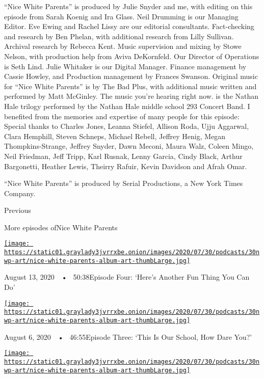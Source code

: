 ``Nice White Parents'' is produced by Julie Snyder and me, with editing
on this episode from Sarah Koenig and Ira Glass. Neil Drumming is our
Managing Editor. Eve Ewing and Rachel Lissy are our editorial
consultants. Fact-checking and research by Ben Phelan, with additional
research from Lilly Sullivan. Archival research by Rebecca Kent. Music
supervision and mixing by Stowe Nelson, with production help from Aviva
DeKornfeld. Our Director of Operations is Seth Lind. Julie Whitaker is
our Digital Manager. Finance management by Cassie Howley, and Production
management by Frances Swanson. Original music for ``Nice White Parents''
is by The Bad Plus, with additional music written and performed by Matt
McGinley. The music you're hearing right now. is the Nathan Hale trilogy
performed by the Nathan Hale middle school 293 Concert Band. I benefited
from the memories and expertise of many people for this episode: Special
thanks to Charles Jones, Leanna Stiefel, Allison Roda, Ujju Aggarwal,
Clara Hemphill, Steven Schneps, Michael Rebell, Jeffrey Henig, Megan
Thompkins-Strange, Jeffrey Snyder, Dawn Meconi, Maura Walz, Coleen
Mingo, Neil Friedman, Jeff Tripp, Karl Rusnak, Lenny Garcia, Cindy
Black, Arthur Bargonetti, Heather Lewis, Theirry Rafuir, Kevin Davidson
and Afrah Omar.

``Nice White Parents'' is produced by Serial Productions, a New York
Times Company.

Previous

More episodes ofNice White Parents

\href{https://www.nytimes3xbfgragh.onion/2020/08/13/podcasts/nice-white-parents-school.html?action=click\&module=audio-series-bar\&region=header\&pgtype=Article}{\texttt{[image: https://static01.graylady3jvrrxbe.onion/images/2020/07/30/podcasts/30nwp-art/nice-white-parents-album-art-thumbLarge.jpg]}}

August 13, 2020~~•~ 50:38Episode Four: `Here's Another Fun Thing You Can
Do'

\href{https://www.nytimes3xbfgragh.onion/2020/08/06/podcasts/episode-three-this-is-our-school-how-dare-you.html?action=click\&module=audio-series-bar\&region=header\&pgtype=Article}{\texttt{[image: https://static01.graylady3jvrrxbe.onion/images/2020/07/30/podcasts/30nwp-art/nice-white-parents-album-art-thumbLarge.jpg]}}

August 6, 2020~~•~ 46:55Episode Three: `This Is Our School, How Dare
You?'

\href{https://www.nytimes3xbfgragh.onion/2020/07/30/podcasts/nice-white-parents-serial-2.html?action=click\&module=audio-series-bar\&region=header\&pgtype=Article}{\texttt{[image: https://static01.graylady3jvrrxbe.onion/images/2020/07/30/podcasts/30nwp-art/nice-white-parents-album-art-thumbLarge.jpg]}}

